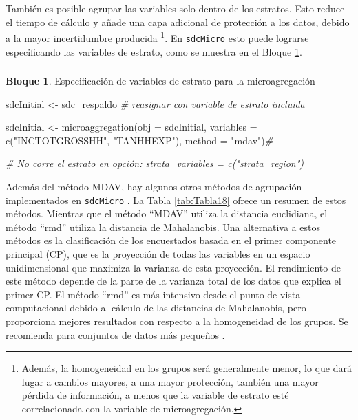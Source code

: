 \documentclass[
]{book}
\newenvironment{Shaded}{\begin{snugshade}}{\end{snugshade}}
\newcommand{\AttributeTok}[1]{\textcolor[rgb]{0.77,0.63,0.00}{#1}}
\newcommand{\CommentTok}[1]{\textcolor[rgb]{0.56,0.35,0.01}{\textit{#1}}}
\newcommand{\FunctionTok}[1]{\textcolor[rgb]{0.00,0.00,0.00}{#1}}
\newcommand{\NormalTok}[1]{#1}
\newcommand{\OtherTok}[1]{\textcolor[rgb]{0.56,0.35,0.01}{#1}}
\newcommand{\StringTok}[1]{\textcolor[rgb]{0.31,0.60,0.02}{#1}}
\theoremstyle{definition}
\theoremstyle{definition}
\newtheorem{example}{Bloque}[chapter]
\theoremstyle{definition}
\theoremstyle{definition}
\theoremstyle{remark}
\begin{document}
También es posible agrupar las variables solo dentro de los estratos. Esto reduce el tiempo de cálculo y añade una capa adicional de protección a los datos, debido a la mayor incertidumbre producida \footnote{Además, la homogeneidad en los grupos será generalmente menor, lo que dará lugar a cambios mayores, a una mayor protección, también una mayor pérdida de información, a menos que la variable de estrato esté correlacionada con la variable de microagregación.}. En \texttt{sdcMicro} esto puede lograrse especificando las variables de estrato, como se muestra en el Bloque \ref{exm:bloque32jgm}.

\hypertarget{section-6}{%
\subsubsection{}\label{section-6}}

\begin{example}
\protect\hypertarget{exm:bloque32jgm}{}\label{exm:bloque32jgm}Especificación de variables de estrato para la microagregación
\end{example}

\begin{Shaded}
\begin{Highlighting}[]
\NormalTok{sdcInitial }\OtherTok{\textless{}{-}}\NormalTok{ sdc\_respaldo }\CommentTok{\# reasignar con variable de estrato incluida}

\NormalTok{sdcInitial }\OtherTok{\textless{}{-}} \FunctionTok{microaggregation}\NormalTok{(}\AttributeTok{obj =}\NormalTok{ sdcInitial, }\AttributeTok{variables =} \FunctionTok{c}\NormalTok{(}\StringTok{"INCTOTGROSSHH"}\NormalTok{, }\StringTok{"TANHHEXP"}\NormalTok{), }\AttributeTok{method =} \StringTok{"mdav"}\NormalTok{)}\CommentTok{\#}

\CommentTok{\# No corre el estrato en opción: strata\_variables = c("strata\_region")}
\end{Highlighting}
\end{Shaded}

Además del método MDAV, hay algunos otros métodos de agrupación implementados en \texttt{sdcMicro} \citep{TeMK14}. La Tabla \ref{tab:Tabla18} ofrece un resumen de estos métodos. Mientras que el método ``MDAV'' utiliza la distancia euclidiana, el método ``rmd'' utiliza la distancia de Mahalanobis. Una alternativa a estos métodos es la clasificación de los encuestados basada en el primer componente principal (CP), que es la proyección de todas las variables en un espacio unidimensional que maximiza la varianza de esta proyección. El rendimiento de este método depende de la parte de la varianza total de los datos que explica el primer CP. El método ``rmd'' es más intensivo desde el punto de vista computacional debido al cálculo de las distancias de Mahalanobis, pero proporciona mejores resultados con respecto a la homogeneidad de los grupos. Se recomienda para conjuntos de datos más pequeños \citep{TeMK14}.
\end{document}

